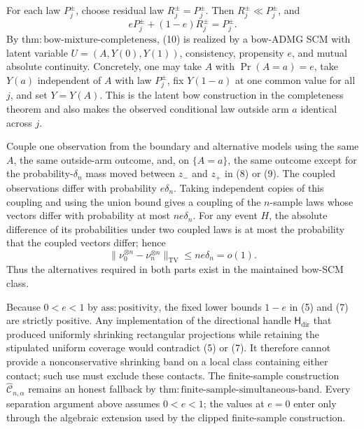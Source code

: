 For each law \(P_j^\pm\), choose residual law \(R_j^\pm=P_j^\pm\).  Then \(R_j^\pm\ll P_j^\pm\), and
\[
 eP_j^\pm+(1-e)R_j^\pm=P_j^\pm. \tag{10}
\]
By \(\mathrm{thm:bow\text{-}mixture\text{-}completeness}\), (10) is realized by a bow-ADMG SCM with latent variable \(U=(A,Y(0),Y(1))\), consistency, propensity \(e\), and mutual absolute continuity.  Concretely, one may take \(A\) with \(\Pr(A=a)=e\), take \(Y(a)\) independent of \(A\) with law \(P_j^\pm\), fix \(Y(1-a)\) at one common value for all \(j\), and set \(Y=Y(A)\).  This is the latent bow construction in the completeness theorem and also makes the observed conditional law outside arm \(a\) identical across \(j\).

Couple one observation from the boundary and alternative models using the same \(A\), the same outside-arm outcome, and, on \(\{A=a\}\), the same outcome except for the probability-\(\delta_n\) mass moved between \(z_-\) and \(z_+\) in (8) or (9).  The coupled observations differ with probability \(e\delta_n\).  Taking independent copies of this coupling and using the union bound gives a coupling of the \(n\)-sample laws whose vectors differ with probability at most \(ne\delta_n\).  For any event \(H\), the absolute difference of its probabilities under two coupled laws is at most the probability that the coupled vectors differ; hence
\[
 \|\nu_0^{\otimes n}-\nu_n^{\otimes n}\|_{\mathrm{TV}}
 \le ne\delta_n=o(1). \tag{11}
\]
Thus the alternatives required in both parts exist in the maintained bow-SCM class.

Because \(0<e<1\) by \(\mathrm{ass:positivity}\), the fixed lower bounds \(1-e\) in (5) and (7) are strictly positive.  Any implementation of the directional handle \(\mathsf H_{\mathrm{dir}}\) that produced uniformly shrinking rectangular projections while retaining the stipulated uniform coverage would contradict (5) or (7).  It therefore cannot provide a nonconservative shrinking band on a local class containing either contact; such use must exclude these contacts.  The finite-sample construction \(\widehat{\mathcal C}_{n,\alpha}\) remains an honest fallback by \(\mathrm{thm:finite\text{-}sample\text{-}simultaneous\text{-}band}\).  Every separation argument above assumes \(0<e<1\); the values at \(e=0\) enter only through the algebraic extension used by the clipped finite-sample construction.